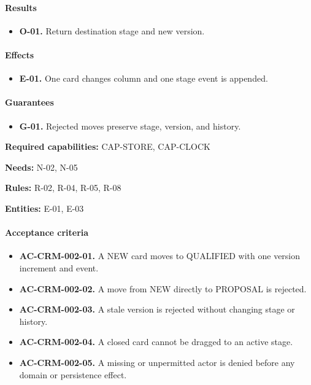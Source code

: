 \documentclass[10pt,a4paper]{article}
\begin{document}
\paragraph{Results}

\begin{itemize}

\item \textbf{O-01.} Return destination stage and new version.

\end{itemize}

\paragraph{Effects}

\begin{itemize}

\item \textbf{E-01.} One card changes column and one stage event is appended.

\end{itemize}

\paragraph{Guarantees}

\begin{itemize}

\item \textbf{G-01.} Rejected moves preserve stage, version, and history.

\end{itemize}

\textbf{Required capabilities:} CAP-STORE, CAP-CLOCK

\textbf{Needs:} N-02, N-05

\textbf{Rules:} R-02, R-04, R-05, R-08

\textbf{Entities:} E-01, E-03

\paragraph{Acceptance criteria}

\begin{itemize}

\item \textbf{AC-CRM-002-01.} A NEW card moves to QUALIFIED with one version increment and event.

\item \textbf{AC-CRM-002-02.} A move from NEW directly to PROPOSAL is rejected.

\item \textbf{AC-CRM-002-03.} A stale version is rejected without changing stage or history.

\item \textbf{AC-CRM-002-04.} A closed card cannot be dragged to an active stage.

\item \textbf{AC-CRM-002-05.} A missing or unpermitted actor is denied before any domain or persistence effect.

\end{itemize}
\end{document}

